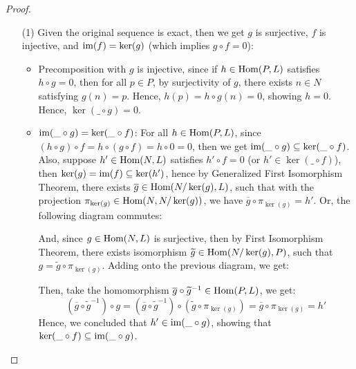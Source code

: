 \documentclass[x11names,reqno,12pt]{extarticle}
\newcommand{\Hom}{\textmd{Hom}}
\begin{document}
\begin{proof}

\hfill

    \begin{itemize}
        \item[(1)] Given the original sequence is exact, then we get $g$ is surjective, $f$ is injective, and $\textmd{im}(f)=\ker(g)$ (which implies $g\circ f=0$):
        \begin{itemize}
            \item Precomposition with $g$ is injective, since if $h\in \Hom(P,L)$ satisfies $h\circ g = 0$, then for all $p\in P$, by surjectivity of $g$, there exists $n\in N$ satisfying $g(n)=p$. Hence, $h(p) = h\circ g(n) = 0$, showing $h=0$. Hence, $\ker(\_\circ g) = 0$.

            \item $\textmd{im}(\_\circ g) = \ker(\_\circ f)$: For all $h\in \Hom(P,L)$, since $(h\circ g)\circ f = h\circ (g\circ f) = h\circ 0 = 0$, then we get $\textmd{im}(\_\circ g)\subseteq \ker(\_\circ f)$. Also, suppose $h'\in \Hom(N,L)$ satisfies $h'\circ f = 0$ (or $h'\in\ker(\_\circ f)$), then $\ker(g)=\textmd{im}(f)\subseteq \ker(h')$, hence by Generalized First Isomorphism Theorem, there exists $\overline{g}\in \Hom(N/\ker(g), L)$, such that with the projection $\pi_{\ker(g)}\in \Hom(N, N/\ker(g))$, we have $\overline{g}\circ \pi_{\ker(g)} = h'$. Or, the following diagram commutes:
            \begin{center}
            \end{center}
            And, since $g\in \Hom(N,L)$ is surjective, then by First Isomorphism Theorem, there exists isomorphism $\tilde{g}\in \Hom(N/\ker(g),P)$, such that $g = \tilde{g}\circ \pi_{\ker(g)}$. Adding onto the previous diagram, we get:
            \begin{center}
            \end{center}
            Then, take the homomorphism $\overline{g}\circ \tilde{g}^{-1}\in \Hom(P, L)$, we get: 
            $$(\overline{g}\circ \tilde{g}^{-1})\circ g = (\overline{g}\circ \tilde{g}^{-1})\circ (\tilde{g}\circ \pi_{\ker(g)}) = \overline{g}\circ \pi_{\ker(g)} = h'$$
            Hence, we concluded that $h' \in \textmd{im}(\_\circ g)$, showing that $\ker(\_\circ f)\subseteq \textmd{im}(\_\circ g)$. 


\end{itemize}
\end{itemize}
\end{proof}
\end{document}
